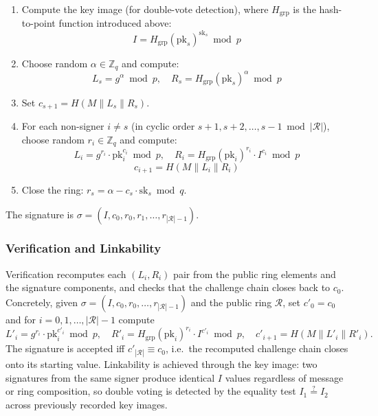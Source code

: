 \begin{enumerate}
    \item Compute the key image (for double-vote detection), where $H_{\text{grp}}$ is the hash-to-point function introduced above:
    \begin{equation}
        I = H_{\text{grp}}(\text{pk}_s)^{\text{sk}_s} \bmod p
        \label{eq:key-image}
    \end{equation}
    \item Choose random $\alpha \in \mathbb{Z}_q$ and compute:
    \begin{equation}
        L_s = g^\alpha \bmod p, \quad R_s = H_{\text{grp}}(\text{pk}_s)^\alpha \bmod p
    \end{equation}
    \item Set $c_{s+1} = H(M \| L_s \| R_s)$.
    \item For each non-signer $i \neq s$ (in cyclic order $s+1, s+2, \ldots, s-1 \bmod |\mathcal{R}|$), choose random $r_i \in \mathbb{Z}_q$ and compute:
    \begin{equation}
        L_i = g^{r_i} \cdot \text{pk}_i^{c_i} \bmod p, \quad R_i = H_{\text{grp}}(\text{pk}_i)^{r_i} \cdot I^{c_i} \bmod p
    \end{equation}
    \begin{equation}
        c_{i+1} = H(M \| L_i \| R_i)
    \end{equation}
    \item Close the ring: $r_s = \alpha - c_s \cdot \text{sk}_s \bmod q$.
\end{enumerate}

The signature is $\sigma = (I, c_0, r_0, r_1, \ldots, r_{|\mathcal{R}|-1})$.

\subsubsection{Verification and Linkability}
\label{subsubsec:ring-verify}

Verification recomputes each $(L_i, R_i)$ pair from the public ring elements and the signature components, and checks that the challenge chain closes back to $c_0$. Concretely, given $\sigma = (I, c_0, r_0, \ldots, r_{|\mathcal{R}|-1})$ and the public ring $\mathcal{R}$, set $c'_0 = c_0$ and for $i = 0, 1, \ldots, |\mathcal{R}|-1$ compute
\begin{equation}
    L'_i = g^{r_i} \cdot \text{pk}_i^{c'_i} \bmod p, \quad R'_i = H_{\text{grp}}(\text{pk}_i)^{r_i} \cdot I^{c'_i} \bmod p, \quad c'_{i+1} = H(M \| L'_i \| R'_i).
    \label{eq:ring-verify}
\end{equation}
The signature is accepted iff $c'_{|\mathcal{R}|} \equiv c_0$, i.e.\ the recomputed challenge chain closes onto its starting value. Linkability is achieved through the key image: two signatures from the same signer produce identical $I$ values regardless of message or ring composition, so double voting is detected by the equality test $I_1 \stackrel{?}{=} I_2$ across previously recorded key images.

